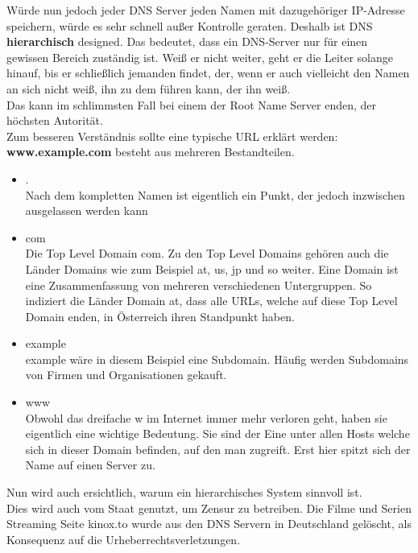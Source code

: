 \documentclass[12pt,a4paper]{report}
\begin{document}
Würde nun jedoch jeder DNS Server jeden Namen mit dazugehöriger IP-Adresse speichern, würde es sehr schnell außer Kontrolle geraten. Deshalb ist DNS \textbf{hierarchisch} designed. Das bedeutet, dass ein DNS-Server nur für einen gewissen Bereich zuständig ist. Weiß er nicht weiter, geht er die Leiter solange hinauf, bis er schließlich jemanden findet, der, wenn er auch vielleicht den Namen an sich nicht weiß, ihn zu dem führen kann, der ihn weiß.\\
Das kann im schlimmsten Fall bei einem der Root Name Server enden, der höchsten Autorität.\\

Zum besseren Verständnis sollte eine typische URL erklärt werden:\\
\textbf{www.example.com} besteht aus mehreren Bestandteilen.
\begin{itemize}
\item .\\
Nach dem kompletten Namen ist eigentlich ein Punkt, der jedoch inzwischen ausgelassen werden kann
\item com\\
Die Top Level Domain \glqq com\grqq . Zu den Top Level Domains gehören auch die Länder Domains wie zum Beispiel at, us, jp und so weiter. Eine Domain ist eine Zusammenfassung von mehreren verschiedenen Untergruppen. So indiziert die Länder Domain at, dass alle URLs, welche auf diese Top Level Domain enden, in Österreich ihren Standpunkt haben.
\item example\\
example wäre in diesem Beispiel eine Subdomain. Häufig werden Subdomains von Firmen und Organisationen gekauft. 
\item www\\
Obwohl das dreifache w im Internet immer mehr verloren geht, haben sie eigentlich eine wichtige Bedeutung. Sie sind der Eine unter allen Hosts welche sich in dieser Domain befinden, auf den man zugreift. Erst hier spitzt sich der Name auf einen Server zu. 
\end{itemize}
Nun wird auch ersichtlich, warum ein hierarchisches System sinnvoll ist.\\

Dies wird auch vom Staat genutzt, um Zensur zu betreiben. Die Filme und Serien Streaming Seite kinox.to wurde aus den DNS Servern in Deutschland gelöscht, als Konsequenz auf die Urheberrechtsverletzungen.\\
\end{document}
